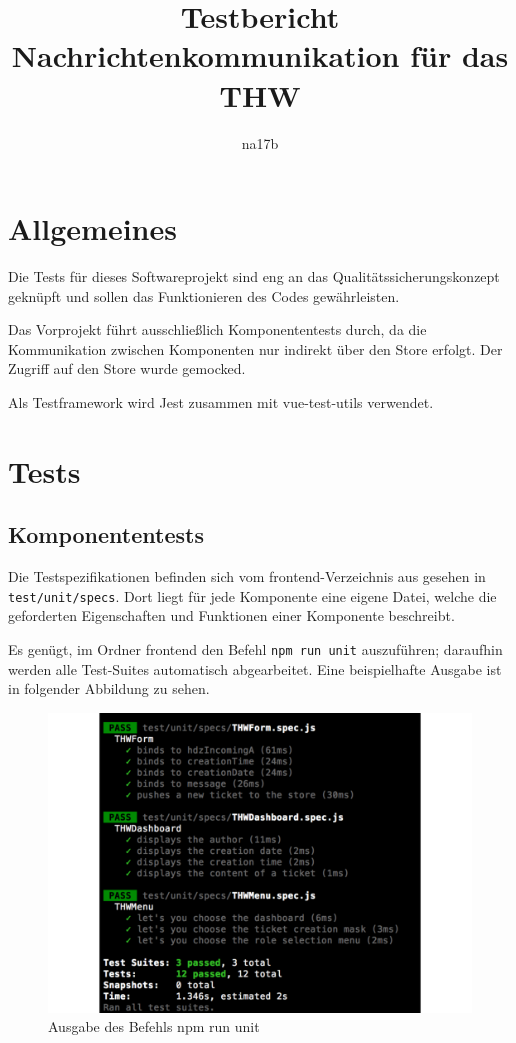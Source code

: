 \documentclass[a4paper,11pt,oneside, titlepage]{article}
\title{Testbericht\\Nachrichtenkommunikation für das THW}
\author{na17b}
\date{}
\begin{document}
  
  \maketitle

  \tableofcontents

  \newpage

  \section{Allgemeines}
  \label{sec:allgemeines}
	
	Die Tests für dieses Softwareprojekt sind eng an das Qualitätssicherungskonzept geknüpft und sollen das Funktionieren des Codes gewährleisten.

    Das Vorprojekt führt ausschließlich Komponententests durch, da die Kommunikation
    zwischen Komponenten nur indirekt über den Store erfolgt. Der Zugriff auf den Store wurde
    gemocked.

    Als Testframework wird \gls{Jest} zusammen mit \gls{vue-test-utils} verwendet.
  
  \section{Tests}
  \label{sec:tests}

    \subsection{Komponententests}
    \label{sub:komponententests}

      Die Testspezifikationen befinden sich vom frontend-Verzeichnis aus gesehen in \verb+test/unit/specs+.
      Dort liegt für jede Komponente eine eigene Datei, welche die geforderten Eigenschaften und Funktionen
      einer Komponente beschreibt.

      Es genügt, im Ordner frontend den Befehl \verb+npm run unit+ auszuführen; daraufhin werden alle
      Test-Suites automatisch abgearbeitet. Eine beispielhafte Ausgabe ist in folgender Abbildung zu sehen.

      \begin{figure}[htpb]
        \centering
        \includegraphics[width=0.8\linewidth]{testsscreenshot}
        \caption{Ausgabe des Befehls npm run unit}
        \label{fig:npmtest}
      \end{figure}
\end{document}
